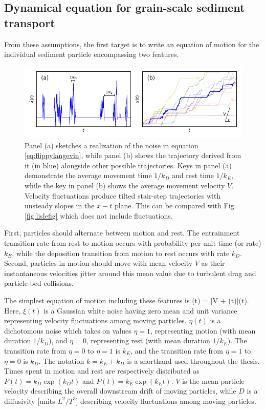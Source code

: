 \subsection{Dynamical equation for grain-scale sediment transport}
From these assumptions, the first target is to write an equation of motion for the individual sediment particle encompassing two features.
\begin{figure}
	\centerline{\includegraphics{./figures/ch2/fig0mod.pdf}}
	\caption{Panel (a) sketches a realization of the noise in equation \ref{eq:flippylangevin}, while panel (b) shows the trajectory derived from it (in blue) alongside other possible trajectories. Keys in panel (a) demonstrate the average movement time $1/k_D$ and rest time $1/k_E$, while the key in panel (b) shows the average movement velocity $V$. Velocity fluctuations produce tilted stair-step trajectories with unsteady slopes in the $x-t$ plane. This can be compared with Fig. \ref{fig:lislefig} which does not include fluctuations.}
	\label{fig:fluxxy0}
\end{figure}
First, particles should alternate between motion and rest.
The entrainment transition rate from rest to motion occurs with probability per unit time (or rate) $k_E$, while the deposition transition from motion to rest occurs with rate $k_D$.
Second, particles in motion should move with mean velocity $V$ as their instantaneous velocities jitter around this mean value due to turbulent drag and particle-bed collisions.

The simplest equation of motion including these features is
\be {}(t) = [V + \xi(t)]\eta(t).  \label{eq:flippylangevin} \ee
Here,  $\xi(t)$ is a Gaussian white noise having zero mean and unit variance representing velocity fluctuations among moving particles. $\eta(t)$ is a dichotomous noise which takes on values $\eta = 1$, representing motion (with mean duration $1/k_D$), and $\eta=0$, representing rest (with mean duration $1/k_E$).
The transition rate from $\eta=0$ to $\eta = 1$ is $k_E$, and the transition rate from $\eta=1$ to $\eta= 0$ is $k_D$. The notation $k=k_E+k_D$ is a shorthand used throughout the thesis.
Times spent in motion and rest are respectively distributed as $P(t) = k_D \exp(k_D t)$ and $P(t) = k_E \exp(k_E t)$.
$V$ is the mean particle velocity describing the overall downstream drift of moving particles, while $D$ is a diffusivity [units $L^2/T^3$] describing velocity fluctuations among moving particles.



